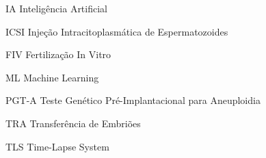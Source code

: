 \begin{siglas}
  \item[IA] Inteligência Artificial
  \item[ICSI] Injeção Intracitoplasmática de Espermatozoides
  \item[FIV] Fertilização In Vitro
  \item[ML] Machine Learning
  \item[PGT-A] Teste Genético Pré-Implantacional para Aneuploidia
  \item[TRA] Transferência de Embriões
  \item[TLS] Time-Lapse System
\end{siglas}
